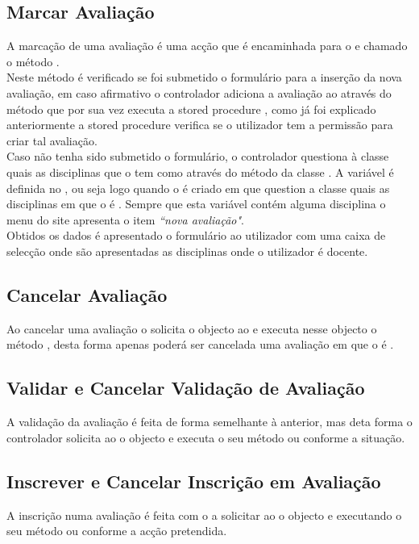 \subsection{Marcar Avaliação}
A marcação de uma avaliação é uma acção que é encaminhada para o  e chamado o método .\\
Neste método é verificado se foi submetido o formulário para a inserção da nova avaliação, em caso afirmativo o controlador adiciona a avaliação ao  através do método  que por sua vez executa a stored procedure , como já foi explicado anteriormente a stored procedure verifica se o utilizador tem a permissão para criar tal avaliação.\\
Caso não tenha sido submetido o formulário, o controlador questiona à classe  quais as disciplinas que o  tem como  através do método  da classe . A variável  é definida no , ou seja logo quando o  é criado em que question a classe  quais as disciplinas em que o  é . Sempre que esta variável contém alguma disciplina o menu do site apresenta o item \textit{``nova avaliação"}.\\
Obtidos os dados é apresentado o formulário ao utilizador com uma caixa de selecção onde são apresentadas as disciplinas onde o utilizador é docente.

\subsection{Cancelar Avaliação}
Ao cancelar uma avaliação o  solicita o objecto  ao  e executa nesse objecto o método , desta forma apenas poderá ser cancelada uma avaliação em que o  é .


\subsection{Validar e Cancelar Validação de Avaliação}
A validação da avaliação é feita de forma semelhante à anterior, mas deta forma o controlador solicita ao  o objecto  e executa o seu método  ou  conforme a situação.

\subsection{Inscrever e Cancelar Inscrição em Avaliação}
A inscrição numa avaliação é feita com o  a solicitar ao  o objecto  e executando o seu método  ou  conforme a acção pretendida.